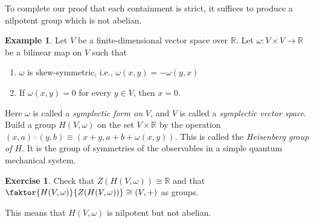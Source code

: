 \documentclass[10pt,letterpaper,cm]{nupset}
\theoremstyle{definition}
\newtheorem{exmp}[definition]{Example}
\theoremstyle{theorem}
\newtheorem{exercise}[definition]{Exercise}
\theoremstyle{remark}
\newcommand{\R}{\mathbb R}
\newcommand{\1}{\mathbf{1}}
\newcommand{\0}{\vec 0}
\begin{document}
To complete our proof that each containment is strict, it suffices to produce a nilpotent group which is not abelian.


\begin{exmp}
Let $V$ be a finite-dimensional vector space over $\R$. Let $\omega: V\times V\to \R$ be a bilinear map on $V$ such that
\begin{enumerate}[label=(\alph*)]
\item $\omega$ is skew-symmetric, i.e., $\omega(x,y) = {-\omega(y,x)}$
\item If $\omega(x,y) =0$ for every $y \in V$, then $x=0$.
\end{enumerate}
Here $\omega$ is called a \textit{symplectic form on $V$}, and $V$ is called a \textit{symplectic vector space}. Build a group $H(V, \omega)$ on the set $V \times \R$ by the operation $\left(x,a\right)\cdot \left(y,b\right) \equiv \left(x+y, a+b + \omega(x,y)\right)$. This is called the \textit{Heisenberg group of $H$}. It is the group of symmetries of the observables in a simple quantum mechanical system. 

\begin{exercise} 
Check that $Z(H(V, \omega)) \cong \R$ and that $\faktor{H(V, \omega)}{Z(H(V, \omega))} \cong \left(V, +\right)$ as groups. 
\end{exercise}
This means that $H(V, \omega)$ is nilpotent but not abelian.
\end{exmp}
\end{document}
